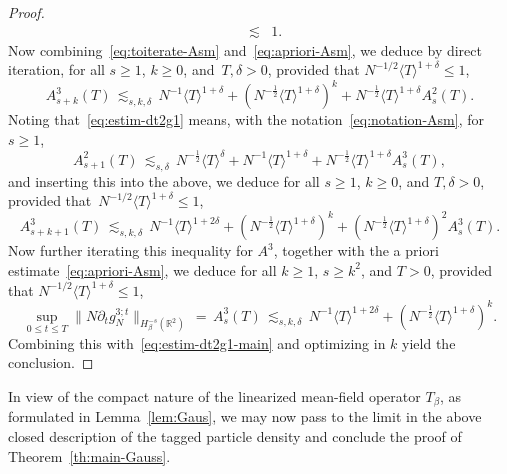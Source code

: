 \documentclass[a4paper,11pt,reqno,noindent]{amsart}
\theoremstyle{plain}
\numberwithin{equation}{section}
\newcommand{\R}{\mathbb R}
\newcommand{\3}{|\!|\!|}
\begin{document}
\begin{proof}
\begin{eqnarray}
&\lesssim&1.\label{eq:apriori-Asm}
\end{eqnarray}
Now combining~\eqref{eq:toiterate-Asm} and~\eqref{eq:apriori-Asm},
we deduce by direct iteration, for all $s\ge1$, $k\ge0$, and~$T,\delta>0$, provided that $N^{-1/2}\langle T\rangle^{1+\delta}\le1$,
\[A_{s+k}^3(T)\,\lesssim_{s,k,\delta}\,N^{-1}\langle T\rangle^{1+\delta}+(N^{-\frac12}\langle T\rangle^{1+\delta})^k+N^{-\frac12}\langle T\rangle^{1+\delta}A_s^2(T).\]
Noting that~\eqref{eq:estim-dt2g1} means, with the notation~\eqref{eq:notation-Asm}, for $s\ge1$,
\begin{equation}
A_{s+1}^2(T)
\,\lesssim_{s,\delta}\,N^{-\frac12}{\langle T\rangle^\delta}+N^{-1}\langle T\rangle^{1+\delta} +N^{-\frac12}\langle T\rangle^{1+\delta}A_s^3(T),
\end{equation}
and inserting this into the above,
we deduce for all $s\ge1$, $k\ge0$, and $T,\delta>0$, provided that~$N^{-1/2}\langle T\rangle^{1+\delta}\le1$,
\[A_{s+k+1}^3(T)\,\lesssim_{s,k,\delta}\,N^{-1}\langle T\rangle^{1+2\delta}+(N^{-\frac12}\langle T\rangle^{1+\delta})^k+(N^{-\frac12}\langle T\rangle^{1+\delta})^2A_{s}^3(T).\]
Now further iterating this inequality for $A^3$, together with the a priori estimate~\eqref{eq:apriori-Asm}, we deduce for all $k\ge1$, $s\ge k^2$, and $T>0$, provided that $N^{-1/2}\langle T\rangle^{1+\delta}\le1$,
\[\sup_{0\le t\le T}\|N\partial_tg_N^{3;t}\|_{H^{-s}_\beta(\R^2)}\,=\,A_{s}^3(T)\,\lesssim_{s,k,\delta}\,N^{-1}\langle T\rangle^{1+2\delta}+(N^{-\frac12}\langle T\rangle^{1+\delta})^k.\]
Combining this with~\eqref{eq:estim-dt2g1-main} and optimizing in $k$ yield the conclusion.
\end{proof}

In view of the compact nature of the linearized mean-field operator $T_\beta$, as formulated in Lemma~\ref{lem:Gaus}, we may now pass to the limit in the above closed description of the tagged particle density and conclude the proof of Theorem~\ref{th:main-Gauss}.
\end{document}
